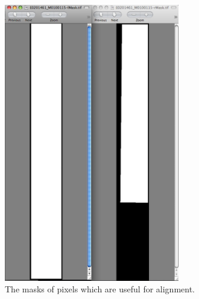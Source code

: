 \begin{figure}
\begin{center}
\includegraphics[width=3in]{images/p19-masks.png}
\caption[P19 images masks]{
    \label{p19-masks}
	The masks of pixels which are useful for alignment.
    }
\end{center}
\end{figure}

